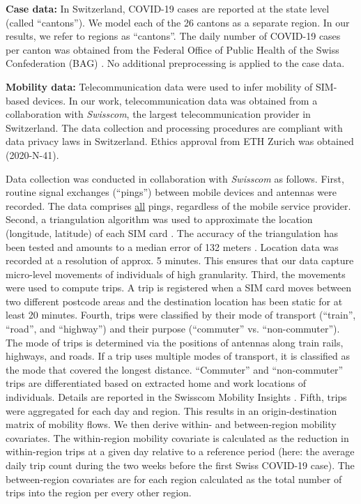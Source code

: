 \documentclass[sigconf, review = false, nonacm = true]{acmart}
\begin{document}
\textbf{Case data:} In Switzerland, COVID-19 cases are reported at the state level (called ``cantons''). We model each of the 26 cantons as a separate region. In our results, we refer to regions as ``cantons''. The daily number of COVID-19 cases per canton was obtained from the Federal Office of Public Health of the Swiss Confederation (BAG) \cite{federal_office_of_public_health_coronavirus_2021}. No additional preprocessing is applied to the case data.

\textbf{Mobility data:} Telecommunication data were used to infer mobility of SIM-based devices. In our work, telecommunication data was obtained from a collaboration with \emph{Swisscom}, the largest telecommunication provider in Switzerland. The data collection and processing procedures are compliant with data privacy laws in Switzerland. Ethics approval from ETH Zurich was obtained (2020-N-41). 

Data collection was conducted in collaboration with \emph{Swisscom} as follows. First, routine signal exchanges (``pings'') between mobile devices and antennas were recorded. The data comprises \underline{all} pings, regardless of the mobile service provider. Second, a triangulation algorithm was used to approximate the location (longitude, latitude) of each SIM card \cite{kafsi_quantifying_2019}. The accuracy of the triangulation has been tested and amounts to a median error of 132 meters \cite{kafsi_quantifying_2019}. Location data was recorded at a resolution of approx. 5 minutes. This ensures that our data capture micro-level movements of individuals of high granularity. Third, the movements were used to compute trips. A trip is registered when a SIM card moves between two different postcode areas and the destination location has been static for at least 20 minutes. Fourth, trips were classified by their mode of transport (``train'', ``road'', and ``highway'') and their purpose (``commuter'' vs. ``non-commuter''). The mode of trips is determined via the positions of antennas along train rails, highways, and roads. If a trip uses multiple modes of transport, it is classified as the mode that covered the longest distance. ``Commuter'' and ``non-commuter'' trips are differentiated based on extracted home and work locations of individuals. Details are reported in the Swisscom Mobility Insights \cite{swisscom_swisscom_2021}. Fifth, trips were aggregated for each day and region. This results in an origin-destination matrix of mobility flows. We then derive within- and between-region mobility covariates. The within-region mobility covariate is calculated as the reduction in within-region trips at a given day relative to a reference period (here: the average daily trip count during the two weeks before the first Swiss COVID-19 case). The between-region covariates are for each region calculated as the total number of trips into the region per every other region.
\end{document}
